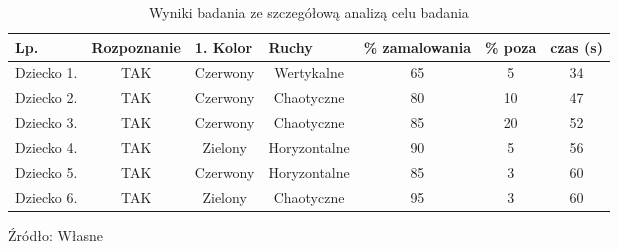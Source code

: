 \documentclass{article}
\begin{document}
	\begin{table}[]
	\centering
	\begin{tabular}{|c|c|c|c|c|c|c|}
		\hline
		\multicolumn{1}{|l|}{Lp.} & \multicolumn{1}{l|}{Rozpoznanie} & \multicolumn{1}{l|}{1. Kolor} & \multicolumn{1}{l|}{Ruchy} & \multicolumn{1}{l|}{\% zamalowania} & \multicolumn{1}{l|}{\% poza} & \multicolumn{1}{l|}{czas (s)} \\ \hline
		Dziecko 1.                & TAK                              & Czerwony                      & Wertykalne                 & 65                                  & 5                            & 34                            \\ \hline
		Dziecko 2.                & TAK                              & Czerwony                      & Chaotyczne                 & 80                                  & 10                           & 47                            \\ \hline
		Dziecko 3.                & TAK                              & Czerwony                      & Chaotyczne                 & 85                                  & 20                           & 52                            \\ \hline
		Dziecko 4.                & TAK                              & Zielony                       & Horyzontalne               & 90                                  & 5                            & 56                            \\ \hline
		Dziecko 5.                & TAK                              & Czerwony                      & Horyzontalne               & 85                                  & 3                            & 60                            \\ \hline
		Dziecko 6.                & TAK                              & Zielony                       & Chaotyczne                 & 95                                  & 3                            & 60                            \\ \hline
	\end{tabular}
	\caption{Wyniki badania ze szczegółową analizą celu badania}
	 Źródło: Własne
\end{table}
\end{document}

